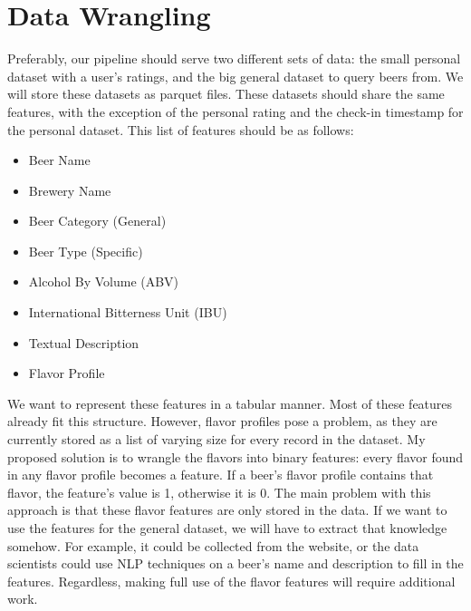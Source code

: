 \documentclass[sigconf, natbib=true]{acmart}
\begin{document}


\section{Data Wrangling}
Preferably, our pipeline should serve two different sets of data: the small personal dataset with a user's ratings, and the big general dataset to query beers from.
We will store these datasets as parquet files.
These datasets should share the same features, with the exception of the personal rating and the check-in timestamp for the personal dataset.
This list of features should be as follows:
\begin{itemize}
    \item Beer Name
    \item Brewery Name
    \item Beer Category (General)
    \item Beer Type (Specific)
    \item Alcohol By Volume (ABV)
    \item International Bitterness Unit (IBU)
    \item Textual Description
    \item Flavor Profile
\end{itemize}
We want to represent these features in a tabular manner.
Most of these features already fit this structure.
However, flavor profiles pose a problem, as they are currently stored as a list of varying size for every record in the \citeauthor{untappd} dataset.
My proposed solution is to wrangle the flavors into binary features: every flavor found in any flavor profile becomes a feature.
If a beer's flavor profile contains that flavor, the feature's value is 1, otherwise it is 0.
The main problem with this approach is that these flavor features are only stored in the \citeauthor{untappd} data.
If we want to use the features for the general dataset, we will have to extract that knowledge somehow.
For example, it could be collected from the \citeauthor{untappd} website, or the data scientists could use NLP techniques on a beer's name and description to fill in the features.
Regardless, making full use of the flavor features will require additional work.
\end{document}
